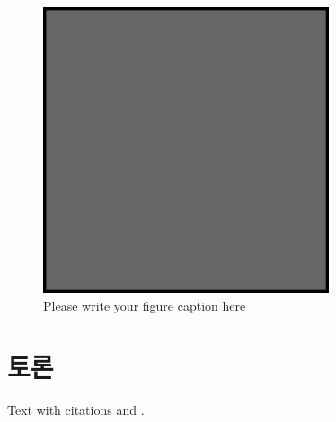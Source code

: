 %
\begin{figure}
  \includegraphics[width=0.75\textwidth]{example.eps}
\caption{Please write your figure caption here}
\label{fig:2}       %
\end{figure}
%

\section{토론}
\label{sec:2}
Text with citations \cite{RefB} and \cite{RefJ}.


